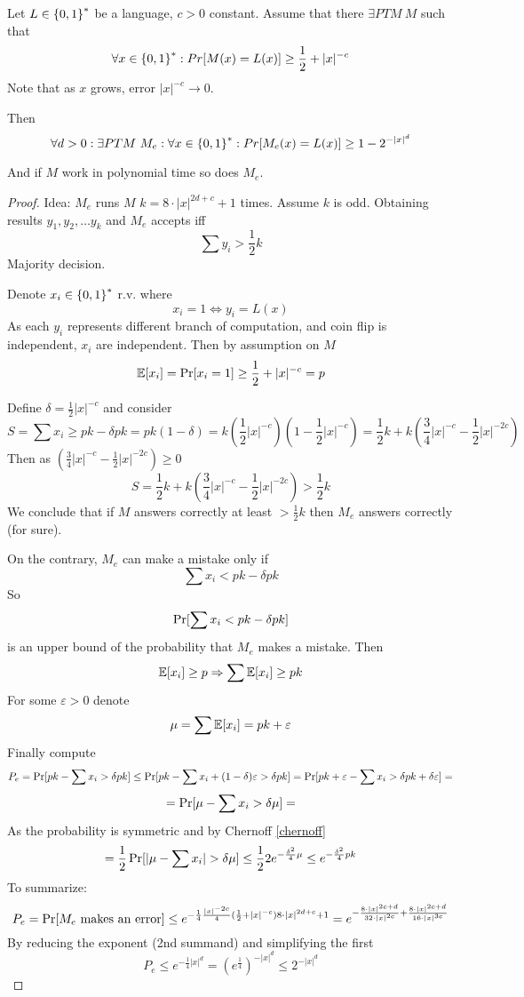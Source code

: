 \begin{theorem}\label{error_reduction}
	Let $L \in \operatorname{\{ 0, 1 \}}^{\ast}$ be a language, $c > 0$ constant.
	Assume that there $\exists PTM\ M$ such that
	\[ \forall x \in \operatorname{\{ 0, 1 \}}^{\ast}: Pr[M(x) = L(x)] \geq \frac{1}{2} + |x|^{-c} \]
	Note that as $x$ grows, error $|x|^{-c} \to 0$.

	Then
	\[ \forall d > 0: \exists PTM \ M_e: \forall x \in \szo^{\ast}:Pr[M_e(x) = L(x)] \geq 1 - 2^{-|x|^d} \]

	And if $M$ work in polynomial time so does $M_e$.
\end{theorem}
\begin{proof}
	Idea: $M_e$ runs $M$ $k = 8 \cdot |x|^{2d + c} + 1$ times.
	Assume $k$ is odd.
	Obtaining results $y_1, y_2, \ldots y_k$ and $M_e$ accepts iff
	\[ \sum y_i > \frac{1}{2} k \]
	Majority decision.

	Denote $x_i \in \operatorname{\{ 0, 1 \}}^{\ast}$ r.v. where
	\[ x_i = 1 \iff y_i = L(x) \]
	As each $y_i$ represents different branch of computation, and coin flip is independent, $x_i$ are independent.
	Then by assumption on $M$
	\[ \mathbb{E}[x_i] = \operatorname{Pr}[x_i = 1] \geq \frac{1}{2} + |x|^{-c} = p \]

	Define $\delta = \frac{1}{2} |x|^{-c}$ and consider
	\[ S = \sum x_i \geq pk - \delta pk = pk (1 - \delta) = k \left(\frac{1}{2} |x|^{-c}\right)\left(1 - \frac{1}{2} |x|^{-c}\right) = \frac{1}{2}k + k\left(\frac{3}{4} |x|^{-c} - \frac{1}{2} |x|^{-2c}\right) \]
	Then as $\left(\frac{3}{4} |x|^{-c} - \frac{1}{2} |x|^{-2c}\right) \geq 0$
	\[ S = \frac{1}{2}k + k\left(\frac{3}{4} |x|^{-c} - \frac{1}{2} |x|^{-2c}\right)  > \frac{1}{2} k \]
	We conclude that if $M$ answers correctly at least $> \frac{1}{2} k$ then $M_e$ answers correctly (for sure).

	On the contrary, $M_e$ can make a mistake only if
	\[ \sum x_i < pk - \delta pk \]
	So
	\[ \operatorname{Pr}[\sum x_i < pk - \delta pk] \]
	is an upper bound of the probability that $M_e$ makes a mistake.
	Then
	\[ \mathbb{E}[x_i] \geq p \Rightarrow \sum \mathbb{E}[x_i] \geq pk \]
	For some $\varepsilon > 0$ denote
	\[\mu = \sum \mathbb{E}[x_i] = pk + \varepsilon \]
	Finally compute
	\[ P_e = \operatorname{Pr}[ pk - \sum x_i > \delta pk] \leq \operatorname{Pr}[ pk - \sum x_i + (1 - \delta)\varepsilon > \delta pk] = \operatorname{Pr}[pk + \varepsilon - \sum x_i > \delta pk + \delta \varepsilon] = \]
	\[ = \operatorname{Pr}[\mu - \sum x_i > \delta \mu ] = \]
	As the probability is symmetric and by Chernoff \cref{chernoff}
	\[ = \frac{1}{2} \operatorname{Pr}[|\mu - \sum x_i| > \delta \mu ] \leq \frac{1}{2} 2 e^{-\frac{\delta^2}{4} \mu} \leq e^{-\frac{\delta^2}{4} pk} \]
	To summarize:
	\[ P_e = \operatorname{Pr}[M_e\ \text{makes an error}] \leq e^{-\frac{1}{4}\frac{|x|^{-2c}}{4} (\frac{1}{2} + |x|^{-c}) 8 \cdot |x|^{2d + c} + 1} = e^{-\frac{8 \cdot |x|^{2c + d}}{32 \cdot |x|^{2c}} + \frac{8 \cdot |x|^{2c + d}}{16 \cdot |x|^{3c}}} \]
	By reducing the exponent (2nd summand) and simplifying the first
	\[ P_e \leq e^{-\frac{1}{4} |x|^d} = (e^{\frac{1}{4}})^{-|x|^d} \leq 2^{-|x|^d} \]
\end{proof}

